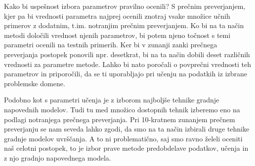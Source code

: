 Kako bi uspešnost izbora parametrov pravilno ocenili? S prečnim preverjanjem, kjer pa bi vrednosti parametra najprej ocenili znotraj vsake množice učnih primerov z dodatnim, t.im. notranjim prečnim preverjanjem. Ko bi na ta način metodi določili vrednost njenih parametrov, bi potem njeno točnost s temi parametri ocenili na testnih primerih. Ker bi v zunanji zanki prečnega preverjanja postopek ponovili npr. desetkrat, bi na ta način dobili deset različnih vrednosti za parametre metode. Lahko bi nato poročali o povprečni vrednosti teh parametrov in priporočili, da se ti uporabljajo pri učenju na podatkih iz izbrane problemske domene.

Podobno kot s parametri učenja je z izborom najboljše tehnike gradnje napovednih modelov. Tudi tu med množico dostopnih tehnik izberemo eno na podlagi notranjega prečnega preverjanja. Pri 10-kratnem zunanjem prečnem preverjanju se nam seveda lahko zgodi, da smo na ta način izbirali druge tehnike gradnje modelov uvrščanja. A to ni problematično, saj smo ravno želeli oceniti naš celotni postopek, to je izbor prave metode predobdelave podatkov, učenja in z njo gradnjo napovednega modela.
